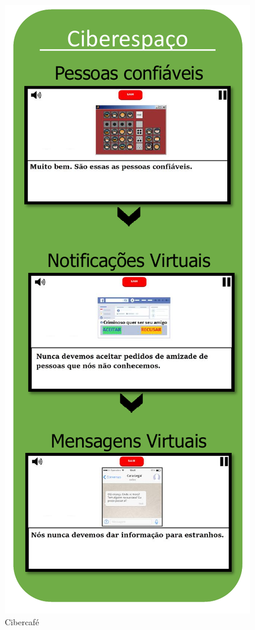 \begin{figure}%
  \vspace{-20pt}
  \caption{\label{fig:Cibercafe}Cibercafé}
  \includegraphics[width=\linewidth]{./Figuras/Cibercafe.pdf}
  \vspace{-1.0cm}
\end{figure}

